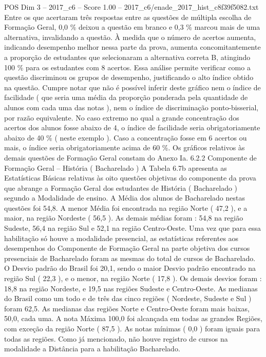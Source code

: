 \begin{textsample}{POS Dim 3 – 2017\_c6 – Score 1.00 – 2017\_c6/enade\_2017\_hist\_c8f39f5082.txt}
Entre os que acertaram três respostas entre as questões de múltipla escolha de Formação Geral, 0,0 \% deixou a questão em branco e 0,3 \% marcou mais de uma alternativa, invalidando a questão.
À medida que o número de acertos aumenta, indicando desempenho melhor nessa parte da prova, aumenta concomitantemente a proporção de estudantes que selecionaram a alternativa correta B, atingindo 100 \% para os estudantes com 8 acertos.
Essa análise permite verificar como a questão discriminou os grupos de desempenho, justificando o alto índice obtido na questão.
Cumpre notar que não é possível inferir deste gráfico nem o índice de facilidade ( que seria uma média da proporção ponderada pela quantidade de alunos com cada uma das notas ), nem o índice de discriminação ponto-bisserial, por razão equivalente.
No caso extremo no qual a grande concentração dos acertos dos alunos fosse abaixo de 4, o índice de facilidade seria obrigatoriamente abaixo de 40 \% ( neste exemplo ).
Caso a concentração fosse em 6 acertos ou mais, o índice seria obrigatoriamente acima de 60 \%.
Os gráficos relativos às demais questões de Formação Geral constam do Anexo Ia. 6.2.2 Componente de Formação Geral – História ( Bacharelado ) A Tabela 6.7b apresenta as Estatísticas Básicas relativas às oito questões objetivas do componente da prova que abrange a Formação Geral dos estudantes de História ( Bacharelado ) segundo a Modalidade de ensino.
A Média dos alunos de Bacharelado nestas questões foi 54,8.
A menor Média foi encontrada na região Norte ( 47,2 ), e a maior, na região Nordeste ( 56,5 ).
As demais médias foram : 54,8 na região Sudeste, 56,4 na região Sul e 52,1 na região Centro-Oeste.
Uma vez que para essa habilitação só houve a modalidade presencial, as estatísticas referentes aos desempenhos do Componente de Formação Geral na parte objetiva dos cursos presenciais de Bacharelado foram as mesmas do total de cursos de Bacharelado.
O Desvio padrão do Brasil foi 20,1, sendo o maior Desvio padrão encontrado na região Sul ( 22,3 ), e o menor, na região Norte ( 17,8 ).
Os demais desvios foram : 18,8 na região Nordeste, e 19,5 nas regiões Sudeste e Centro-Oeste.
As medianas do Brasil como um todo e de três das cinco regiões ( Nordeste, Sudeste e Sul ) foram 62,5.
As medianas das regiões Norte e Centro-Oeste foram mais baixas, 50,0, cada uma.
A nota Máxima 100,0 foi alcançada em todas as grandes Regiões, com exceção da região Norte ( 87,5 ).
As notas mínimas ( 0,0 ) foram iguais para todas as regiões.
Como já mencionado, não houve registro de cursos na modalidade a Distância para a habilitação Bacharelado.

\end{textsample}
